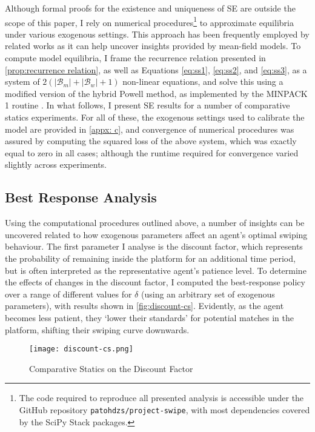 Although formal proofs for the existence and uniqueness of SE are outside the scope of this paper, I rely on numerical procedures\footnote{The code required to reproduce all presented analysis is accessible under the GitHub repository \texttt{patohdzs/project-swipe}, with most dependencies covered by the SciPy Stack packages.} to approximate equilibria under various exogenous settings. 
This approach has been frequently employed by related works \citep[see][]{iyer2014mean, gummadi2011optimal} as it can help uncover insights provided by mean-field models. 
To compute model equilibria, I frame the recurrence relation presented in \autoref{prop:recurrence relation}, as well as Equations \ref{eq:ss1}, \ref{eq:ss2}, and \ref{eq:ss3}, as a system of $2(|\mathcal{B}_m|+|\mathcal{B}_w|+1)$ non-linear equations, and solve this using a modified version of the hybrid Powell method, as implemented by the MINPACK 1 routine \citep{more1980user}. 
In what follows, I present SE results for a number of comparative statics experiments. 
For all of these, the exogenous settings used to calibrate the model are provided in \autoref{appx: c}, and convergence of numerical procedures was assured by computing the squared loss of the above system, which was exactly equal to zero in all cases; although the runtime required for convergence varied slightly across experiments.

\subsection{Best Response Analysis}\label{sec:section3.2} 
Using the computational procedures outlined above, a number of insights can be uncovered related to how exogenous parameters affect an agent's optimal swiping behaviour. 
The first parameter I analyse is the discount factor, which represents the probability of remaining inside the platform for an additional time period, but is often interpreted as the representative agent's patience level.
To determine the effects of changes in the discount factor, I computed the best-response policy over a range of different values for $\delta$ (using an arbitrary set of exogenous parameters), with results shown in \autoref{fig:discount-cs}. 
Evidently, as the agent becomes less patient, they `lower their standards' for potential matches in the platform, shifting their swiping curve downwards. 

\begin{figure}[ht] 
    \centering
    \caption{Comparative Statics on the Discount Factor}
    \texttt{[image: discount-cs.png]}
    \label{fig:discount-cs}
\end{figure} 

